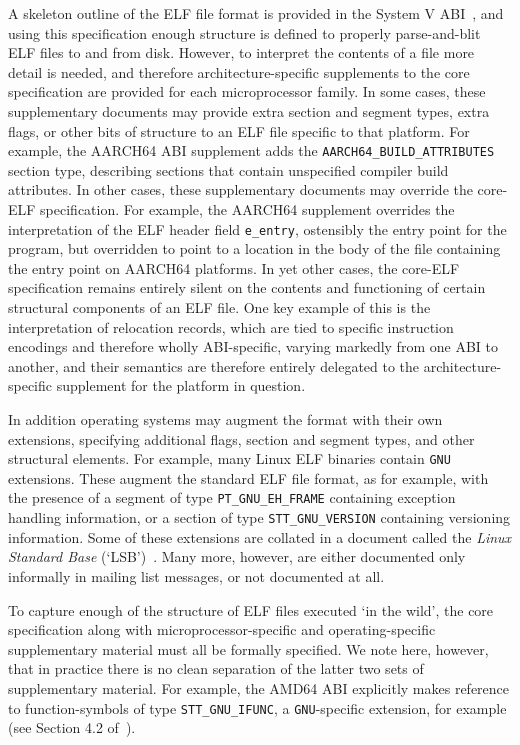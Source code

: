 A skeleton outline of the ELF file format is provided in the System V ABI~\cite{elf-sco-model}, and using this specification enough structure is defined to properly parse-and-blit ELF files to and from disk.
However, to interpret the contents of a file more detail is needed, and therefore architecture-specific supplements to the core specification are provided for each microprocessor family.
In some cases, these supplementary documents may provide extra section and segment types, extra flags, or other bits of structure to an ELF file specific to that platform.
For example, the AARCH64 ABI supplement adds the \texttt{AARCH64\_BUILD\_ATTRIBUTES} section type, describing sections that contain unspecified compiler build attributes.
In other cases, these supplementary documents may override the core-ELF specification.
For example, the AARCH64 supplement overrides the interpretation of the ELF header field \texttt{e\_entry}, ostensibly the entry point for the program, but overridden to point to a location in the body of the file containing the entry point on AARCH64 platforms.
In yet other cases, the core-ELF specification remains entirely silent on the contents and functioning of certain structural components of an ELF file.
One key example of this is the interpretation of relocation records, which are tied to specific instruction encodings and therefore wholly ABI-specific, varying markedly from one ABI to another, and their semantics are therefore entirely delegated to the architecture-specific supplement for the platform in question.

In addition operating systems may augment the format with their own extensions, specifying additional flags, section and segment types, and other structural elements.
For example, many Linux ELF binaries contain \texttt{GNU} extensions.
These augment the standard ELF file format, as for example, with the presence of a segment of type \texttt{PT\_GNU\_EH\_FRAME} containing exception handling information, or a section of type \texttt{STT\_GNU\_VERSION} containing versioning information.
Some of these extensions are collated in a document called the \emph{Linux Standard Base} (`LSB')~\cite{linux-standard-base}.
Many more, however, are either documented only informally in mailing list messages, or not documented at all.

To capture enough of the structure of ELF files executed `in the wild', the core specification along with microprocessor-specific and operating-specific supplementary material must all be formally specified.
We note here, however, that in practice there is no clean separation of the latter two sets of supplementary material.
For example, the AMD64 ABI explicitly makes reference to function-symbols of type \texttt{STT\_GNU\_IFUNC}, a \texttt{GNU}-specific extension, for example (see Section 4.2 of~\cite{amd64-abi}).


